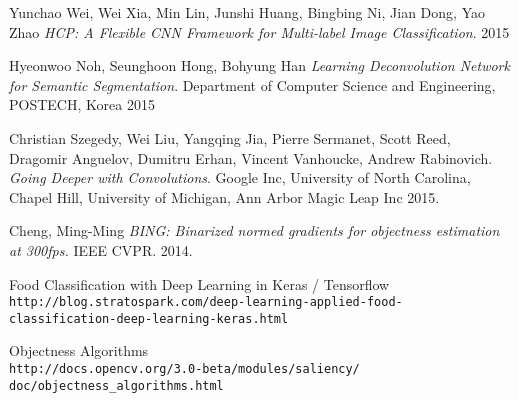 \documentclass[13pt, a4paper]{extreport}
\begin{document}
\begin{thebibliography}{9}
Yunchao Wei, Wei Xia, Min Lin, Junshi Huang, Bingbing Ni, Jian Dong, Yao Zhao
\textit{HCP: A Flexible CNN Framework for Multi-label Image Classification}. 
2015

Hyeonwoo Noh, Seunghoon Hong, Bohyung Han
\textit{Learning Deconvolution Network for Semantic Segmentation}. 
Department of Computer Science and Engineering, POSTECH, Korea 2015

Christian Szegedy, Wei Liu, Yangqing Jia, Pierre Sermanet, Scott Reed, Dragomir Anguelov, Dumitru Erhan, Vincent Vanhoucke, Andrew Rabinovich.
\textit{Going Deeper with Convolutions}. 
Google Inc, University of North Carolina, Chapel Hill, University of Michigan, Ann Arbor Magic Leap Inc 2015.

Cheng, Ming-Ming
\textit{BING: Binarized normed gradients for objectness estimation at 300fps.}
IEEE CVPR. 2014.
 
Food Classification with Deep Learning in Keras / Tensorflow
\\\texttt{http://blog.stratospark.com/deep-learning-applied-food-\\classification-deep-learning-keras.html}

Objectness Algorithms
\\\texttt{http://docs.opencv.org/3.0-beta/modules/saliency/\\doc/objectness\_algorithms.html}

\end{thebibliography}
\end{document}
